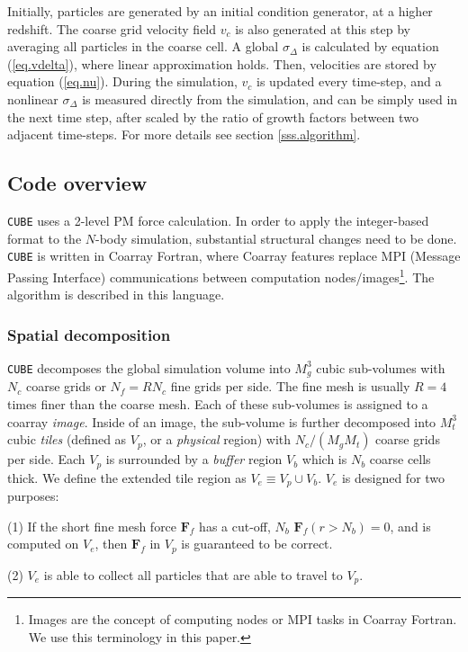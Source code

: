 \documentclass[10pt,twocolumn,reprint]{emulateapj}
\newcommand{\bs}{\boldsymbol}
\begin{document}
Initially, particles are generated by an initial condition generator, at a higher redshift. The coarse grid velocity field $v_c$ is also generated at this step by averaging all particles in the coarse cell. A global $\sigma_\Delta$ is calculated by equation (\ref{eq.vdelta}), where linear approximation holds. Then, velocities are stored by equation (\ref{eq.nu}). During the simulation, $v_c$ is updated every time-step, and a nonlinear $\sigma_\Delta$ is measured directly from the simulation, and can be simply used in the next time step, after scaled by the ratio of growth factors between two adjacent time-steps. For more details see section \ref{sss.algorithm}.

\subsection{Code overview}\label{ss.overview}
{\tt CUBE} uses a 2-level PM force calculation. In order to apply the integer-based format to the $N$-body simulation, substantial structural changes need to be done. {\tt CUBE} is written in Coarray Fortran, where Coarray features replace MPI (Message Passing Interface) communications between computation nodes/images\footnote{Images are the concept of computing nodes or MPI tasks in Coarray Fortran. We use this terminology in this paper.}. The algorithm is described in this language.

\subsubsection{Spatial decomposition}\label{sss.spatial_decomposition}
{\tt CUBE} decomposes the global simulation volume into $M_g^3$ cubic sub-volumes with $N_c$ coarse grids or $N_f=RN_c$ fine grids per side. The fine mesh is usually $R=4$ times finer than the coarse mesh. Each of these sub-volumes is assigned to a coarray {\it image}. Inside of an image, the sub-volume is further decomposed into $M_t^3$ cubic {\it tiles} (defined as $V_p$, or a {\it physical} region) with $N_c/(M_g M_t)$ coarse grids per side. Each $V_p$ is surrounded by a {\it buffer} region $V_b$ which is $N_b$ coarse cells thick. We define the extended tile region as $V_e\equiv V_p\cup V_b$. $V_e$ is designed for two purposes:

(1) If the short fine mesh force ${\bs F}_f$ has a cut-off, $N_b$ ${\bs F}_f(r>N_b)=0$, and is computed on $V_e$, then ${\bs F}_f$ in $V_p$ is guaranteed to be correct. 

(2) $V_e$ is able to collect all particles that are able to travel to $V_p$.
\end{document}
